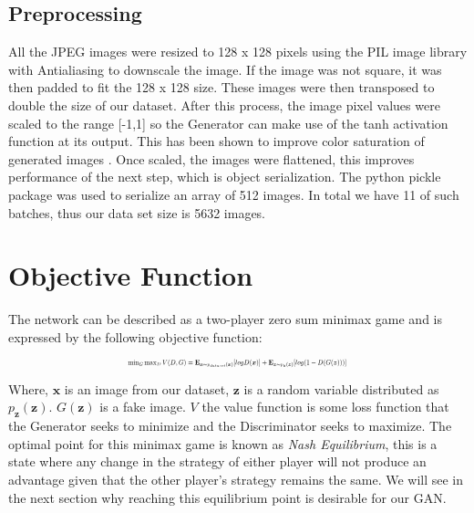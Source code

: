 \documentclass[conference]{IEEEtran}
\begin{document}
\subsection{Preprocessing}
All the JPEG images were resized to 128 x 128 pixels using the PIL image library with Antialiasing to downscale the image. If the image was not square, it was then padded to fit the 128 x 128 size. These images were then transposed to double the size of our dataset. After this process, the image pixel values were scaled to the range [-1,1] so the Generator can make use of the tanh activation function at its output. This has been shown to improve color saturation of generated images \cite{radford2015unsupervised}. Once scaled, the images were flattened, this improves performance of the next step, which is object serialization. The python pickle package was used to serialize an array of 512 images. In total we have 11 of such batches, thus our data set size is 5632 images.



\section{Objective Function}

The network can be described as a two-player zero sum minimax game and is expressed by the following objective function:
\begin{figure}[H]

\begin{equation}
    
    \resizebox{0.5\textwidth}{!}{$\min_{G}\max_{D} V(D,G) =  \mathbf{E}_{\boldsymbol{x}\sim{p_{dataset}(\boldsymbol{x})}}[log D(\boldsymbol{x})] + \mathbf{E}_{\boldsymbol{z}\sim{p_{\boldsymbol{z}}(\boldsymbol{z})}}[log(1-D(G(\boldsymbol{z})))]$}
    
\end{equation}

\end{figure}



Where, $\boldsymbol{x}$ is an image from our dataset, $\boldsymbol{z}$ is a random variable distributed as $p_{\boldsymbol{z}}(\boldsymbol{z})$. $G(\boldsymbol{z})$ is a fake image. $V$ the value function is some loss function that the Generator seeks to minimize and the Discriminator seeks to maximize. The optimal point for this minimax game is known as \emph{Nash Equilibrium}, this is a state where any change in the strategy of either player will not produce an advantage given that the other player's strategy remains the same. We will see in the next section why reaching this equilibrium point is desirable for our GAN.
\end{document}
